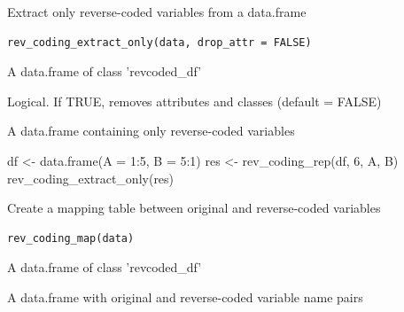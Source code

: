 \documentclass[a4paper]{book}
\begin{document}
%
\begin{Description}
Extract only reverse-coded variables from a data.frame
\end{Description}
%
\begin{Usage}
\begin{verbatim}
rev_coding_extract_only(data, drop_attr = FALSE)
\end{verbatim}
\end{Usage}
%
\begin{Arguments}
\begin{ldescription}
\item[\code{data}] A data.frame of class 'revcoded\_df'

\item[\code{drop\_attr}] Logical. If TRUE, removes attributes and classes (default = FALSE)
\end{ldescription}
\end{Arguments}
%
\begin{Value}
A data.frame containing only reverse-coded variables
\end{Value}
%
\begin{Examples}
\begin{ExampleCode}
df <- data.frame(A = 1:5, B = 5:1)
res <- rev_coding_rep(df, 6, A, B)
rev_coding_extract_only(res)
\end{ExampleCode}
\end{Examples}
%
\begin{Description}
Create a mapping table between original and reverse-coded variables
\end{Description}
%
\begin{Usage}
\begin{verbatim}
rev_coding_map(data)
\end{verbatim}
\end{Usage}
%
\begin{Arguments}
\begin{ldescription}
\item[\code{data}] A data.frame of class 'revcoded\_df'
\end{ldescription}
\end{Arguments}
%
\begin{Value}
A data.frame with original and reverse-coded variable name pairs
\end{Value}
\end{document}
